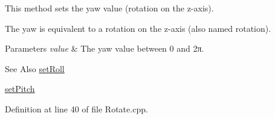 This method sets the yaw value (rotation on the z-\/axis). 

The yaw is equivalent to a rotation on the z-\/axis (also named rotation).


\begin{DoxyParams}{Parameters}
{\em value} & The yaw value between 0 and 2π. \\
\hline
\end{DoxyParams}
\begin{DoxySeeAlso}{See Also}
\hyperlink{class_hoa3_d_1_1_rotate_a89599a9cd8c10240ce71b8fd7bdbb3b7}{set\-Roll} 

\hyperlink{class_hoa3_d_1_1_rotate_aeb7e844c29c2f9bb9cc7de3ef89385f6}{set\-Pitch} 
\end{DoxySeeAlso}


Definition at line 40 of file Rotate.\-cpp.


